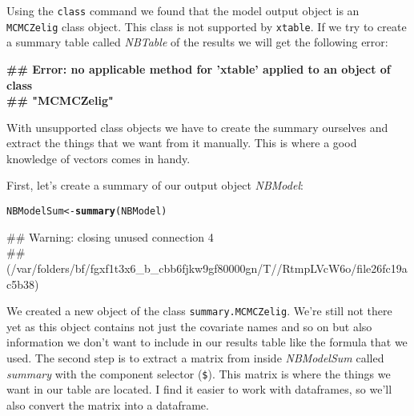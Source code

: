 \documentclass[ChapterTOCs,krantz1]{krantz}\usepackage{graphicx, color}
\makeatletter
\newcommand{\hlfunctioncall}[1]{\textcolor[rgb]{0.501960784313725,0,0.329411764705882}{\textbf{#1}}}%
\newenvironment{kframe}{%
 \def\at@end@of@kframe{}%
 \ifinner\ifhmode%
  \def\at@end@of@kframe{\end{minipage}}%
  \begin{minipage}{\columnwidth}%
 \fi\fi%
 \def\FrameCommand##1{\hskip\@totalleftmargin \hskip-\fboxsep
 \colorbox{shadecolor}{##1}\hskip-\fboxsep
     \hskip-\linewidth \hskip-\@totalleftmargin \hskip\columnwidth}%
 \MakeFramed {\advance\hsize-\width
   \@totalleftmargin\z@ \linewidth\hsize
   \@setminipage}}%
 {\par\unskip\endMakeFramed%
 \at@end@of@kframe}
\newenvironment{knitrout}{}{} %
\makeatother
\begin{document}
Using the {\tt{class}} command we found that the model output object is an {\tt{MCMCZelig}} class object. This class is not supported by {\tt{xtable}}. If we try to create a summary table called {\emph{NBTable}} of the results we will get the following error:

\begin{knitrout}
\color{fgcolor}\begin{kframe}
\begin{flushleft}\ttfamily\noindent\bfseries\textcolor{errorcolor}{\#\# Error: no applicable method for 'xtable' applied to an object of class \\ 
\#\# "MCMCZelig"}\end{flushleft}\end{kframe}
\end{knitrout}


With unsupported class objects we have to create the summary ourselves and extract the things that we want from it manually. This is where a good knowledge of vectors comes in handy. 

First, let's create a summary of our output object {\emph{NBModel}}:

\begin{knitrout}
\color{fgcolor}\begin{kframe}
\begin{alltt}
NBModelSum <- \hlfunctioncall{summary}(NBModel)
\end{alltt}
\begin{flushleft}\ttfamily\noindent\textcolor{warningcolor}{\#\# Warning: closing unused connection 4 \\ 
\#\# (/var/folders/bf/fgxf1t3x6\_b\_cbb6fjkw9gf80000gn/T//RtmpLVcW6o/file26fc19ac5b38)}\end{flushleft}\end{kframe}
\end{knitrout}


We created a new object of the class {\tt{summary.MCMCZelig}}. We're still not there yet as this object contains not just the covariate names and so on but also information we don't want to include in our results table like the formula that we used. The second step is to extract a matrix from inside {\emph{NBModelSum}} called {\emph{summary}} with the component selector ({\tt{\$}}). This matrix is where the things we want in our table are located. I find it easier to work with dataframes, so we'll also convert the matrix into a dataframe.
\end{document}
